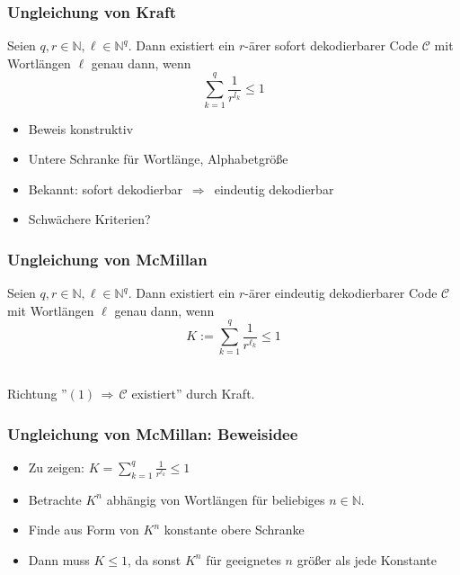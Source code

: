 \documentclass{beamer}
\begin{document}
\begin{frame}[t]
    \frametitle{Ungleichung von Kraft}
    Seien $q,r \in \mathbb{N}, \ell \in \mathbb{N}^q$. Dann existiert ein $r$-ärer sofort dekodierbarer Code $\mathcal{C}$
    mit Wortlängen $\ell$ genau dann, wenn
    $$
        \sum_{k=1}^{q} \frac{1}{r^{l_k}} \leq 1
    $$
    \begin{itemize}
        \setlength\itemsep{1em}
        \item Beweis konstruktiv
        \item Untere Schranke für Wortlänge, Alphabetgröße
        \setlength\itemsep{3em}
        \pause
        \item Bekannt: sofort dekodierbar $\,\Longrightarrow\,$ eindeutig dekodierbar
        \setlength\itemsep{1em}
        \item Schwächere Kriterien?
    \end{itemize}
\end{frame}

\begin{frame}[t]
    \frametitle{Ungleichung von McMillan}
    Seien $q,r \in \mathbb{N}, \ell \in \mathbb{N}^q$. Dann existiert ein $r$-ärer eindeutig dekodierbarer Code $\mathcal{C}$
    mit Wortlängen $\ell$ genau dann, wenn
    \begin{equation}
        K := \sum_{k=1}^{q} \frac{1}{r^{\ell_k}} \leq 1
    \end{equation}\\[20pt]
    \pause

    Richtung ''$(1) \,\Longrightarrow\, \mathcal{C}$ existiert'' durch Kraft.\\
\end{frame}

\begin{frame}[t]
    \frametitle{Ungleichung von McMillan: Beweisidee}
    \begin{itemize}
        \setlength\itemsep{1.3em}
        \item Zu zeigen: $K = \sum_{k=1}^{q} \frac{1}{r^{\ell_k}} \leq 1$
        \item Betrachte $K^n$ abhängig von Wortlängen für beliebiges $n \in \mathbb{N}$.
        \item Finde aus Form von $K^n$ konstante obere Schranke
        \item Dann muss $K \leq 1$, da sonst $K^n$ für geeignetes $n$ größer
            als jede Konstante
    \end{itemize}
\end{frame}
\end{document}
